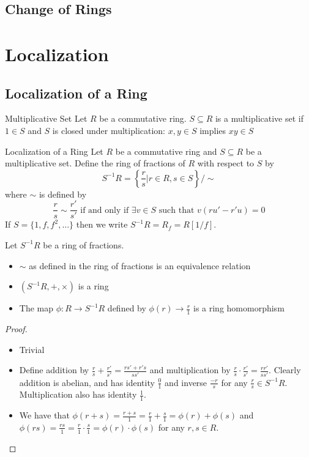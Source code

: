 \documentclass[a4paper]{article}
\begin{document}
\subsection{Change of Rings}


\pagebreak
\section{Localization}
\subsection{Localization of a Ring}
\begin{defn}{Multiplicative Set}{} Let $R$ be a commutative ring. $S\subseteq R$ is a multiplicative set if $1\in S$ and $S$ is closed under multiplication: $x,y\in S$ implies $xy\in S$
\end{defn}

\begin{defn}{Localization of a Ring}{} Let $R$ be a commutative ring and $S\subseteq R$ be a multiplicative set. Define the ring of fractions of $R$ with respect to $S$ by $$S^{-1}R=\left\{\frac{r}{s}|r\in R,s\in S\right\}/\sim$$ where $\sim$ is defined by $$\frac{r}{s}\sim\frac{r'}{s'}\text{ if and only if }\exists v\in S\text{ such that }v(ru'-r'u)=0$$
If $S=\{1,f,f^2,\dots\}$ then we write $S^{-1}R=R_f=R[1/f]$. 
\end{defn}

\begin{prp}{}{} Let $S^{-1}R$ be a ring of fractions. 
\begin{itemize}
\item $\sim$ as defined in the ring of fractions is an equivalence relation
\item $(S^{-1}R,+,\times)$ is a ring
\item The map $\phi:R\to S^{-1}R$ defined by $\phi(r)\to\frac{r}{1}$ is a ring homomorphism
\end{itemize}\tcbline
\begin{proof}~\\
\begin{itemize}
\item Trivial
\item Define addition by $\frac{r}{s}+\frac{r'}{s'}=\frac{rs'+r's}{ss'}$ and multiplication by $\frac{r}{s}\cdot\frac{r'}{s'}=\frac{rr'}{ss'}$. Clearly addition is abelian, and has identity $\frac{0}{1}$ and inverse $\frac{-r}{s}$ for any $\frac{r}{s}\in S^{-1}R$. Multiplication also has identity $\frac{1}{1}$. 
\item We have that $\phi(r+s)=\frac{r+s}{1}=\frac{r}{1}+\frac{s}{1}=\phi(r)+\phi(s)$ and $\phi(rs)=\frac{rs}{1}=\frac{r}{1}\cdot\frac{s}{1}=\phi(r)\cdot\phi(s)$ for any $r,s\in R$. 
\end{itemize}
\end{proof}
\end{prp}
\end{document}
